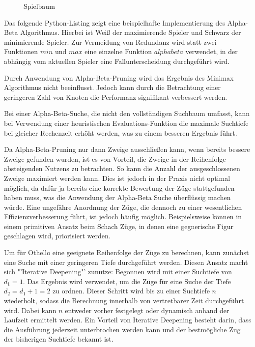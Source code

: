 \begin{figure}
    \centering
    \caption{Spielbaum}
    \label{fig:game_tree_ab_pruning}
\end{figure}

Das folgende Python-Listing zeigt eine beispielhafte Implementierung des Alpha-Beta Algorithmus. Hierbei ist Weiß der
maximierende Spieler und Schwarz der minimierende Spieler. Zur Vermeidung von Redundanz wird statt zwei Funktionen $min$
und $max$ eine einzelne Funktion $alphabeta$ verwendet, in der abhängig vom aktuellen Spieler eine Fallunterscheidung
durchgeführt wird.



Durch Anwendung von Alpha-Beta-Pruning wird das Ergebnis des Minimax Algorithmus nicht beeinflusst. Jedoch kann durch
die Betrachtung einer geringeren Zahl von Knoten die Performanz signifikant verbessert werden.

Bei einer Alpha-Beta-Suche, die nicht den vollständigen Suchbaum umfasst, kann bei Verwendung einer heuristischen
Evaluations-Funktion die maximale Suchtiefe bei gleicher Rechenzeit erhöht werden, was zu einem besseren Ergebnis führt.

Da Alpha-Beta-Pruning nur dann Zweige ausschließen kann, wenn bereits bessere Zweige gefunden wurden, ist es von
Vorteil, die Zweige in der Reihenfolge absteigenden Nutzens zu betrachten. So kann die Anzahl der ausgeschlossenen
Zweige maximiert werden kann. Dies ist jedoch in der Praxis nicht optimal möglich, da dafür ja bereits eine korrekte
Bewertung der Züge stattgefunden haben muss, was die Anwendung der Alpha-Beta Suche überflüssig machen würde. Eine
ungefähre Anordnung der Züge, die dennoch zu einer wesentlichen Effizienzverbesserung führt, ist jedoch häufig möglich.
Beispielsweise können in einem primitiven Ansatz beim Schach Züge, in denen eine gegnerische Figur geschlagen wird,
priorisiert werden.

Um für Othello eine geeignete Reihenfolge der Züge zu berechnen, kann zunächst eine Suche mit einer geringeren Tiefe
durchgeführt werden. Diesen Ansatz macht sich "'Iterative Deepening"' zunutze: Begonnen wird mit einer Suchtiefe von
$d_1=1$. Das Ergebnis wird verwendet, um die Züge für eine Suche der Tiefe $d_2=d_1+1=2$ zu ordnen. Dieser Schritt wird
bis zu einer Suchtiefe $n$ wiederholt, sodass die Berechnung innerhalb von vertretbarer Zeit durchgeführt wird. Dabei
kann $n$ entweder vorher festgelegt oder dynamisch anhand der Laufzeit ermittelt werden. Ein Vorteil von Iterative
Deepening besteht darin, dass die Ausführung jederzeit unterbrochen werden kann und der bestmögliche Zug der bisherigen
Suchtiefe bekannt ist.
\cite{alphabetaefficiency}

